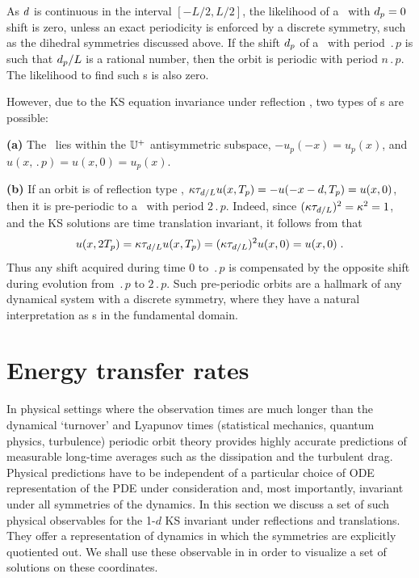 {As $d$ is continuous in the interval $[-L/2, L/2]$,
the likelihood of a \rpo\ with $d_p = 0$ shift is zero,
unless an exact periodicity is enforced by a discrete symmetry,
such as the dihedral symmetries discussed above.
If the shift $d_p$ of a \rpo\ with period $\period{p}$ is such
that $d_p /L$ is a rational number, then the orbit is
periodic with period $n\period{p}$.  The likelihood to find such \po s is
also zero.

However, due to the KS equation invariance under reflection ,
two types of \po s are possible:

{\bf (a)} The \po\ lies within the  $\mathbb{U}^+$ antisymmetric subspace,
$-u_p(-x) = u_p(x)$, and $u(x,\period{p}) = u(x,0) = u_p(x)$.

{\bf (b)} If an
orbit is of reflection type ,
$\kappa\tau_{d/L} u(x,{T_{p}}) =
-u(-x-d,{T_{p}}) = u(x,0)$, then it is
pre-periodic to a \po\ with period
$2\period{p}$.
Indeed, since $(\kappa\tau_{d/L})^2 = \kappa^2 = 1$,
 and the KS solutions
are time translation invariant, it follows
from  that
\[
  u(x,2{T_{p}}) = \kappa\tau_{d/L} u(x,{T_{p}}) =
  (\kappa\tau_{d/L})^2 u(x,0) = u(x,0)\;.
\]
Thus any shift acquired during time $0$ to
$\period{p}$ is compensated by the opposite shift during
evolution from $\period{p}$ to $2 \period{p}$.
Such pre-periodic orbits
are a hallmark of any dynamical system with a discrete
symmetry, where they have a natural
interpretation as \po s in the
fundamental domain.
}%

\section{Energy transfer rates}
\label{sec:energy}

In physical settings where the observation times are much longer than
the dynamical `turnover' and Lyapunov times (statistical mechanics,
quantum physics, turbulence) periodic orbit theory provides
highly accurate predictions of measurable long-time averages such as
the dissipation and the turbulent drag. Physical predictions have to be
independent of a particular choice of ODE representation of the PDE
under consideration and, most importantly, invariant under all
symmetries of the dynamics. In this section we discuss a set of such
physical observables for the  1-$d$ KS invariant under reflections and
translations. They offer a representation of dynamics in which the
symmetries are explicitly quotiented out. We shall use these observable in
 in order to visualize a set of solutions on
these coordinates.

